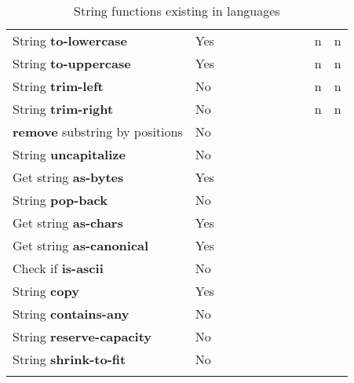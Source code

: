 \documentclass[anonymous,sigplan,review,11pt,nonacm,natbib=false]{acmart}
\begin{document}
\begin{longtable}{lllllllllll}
        String \textbf{to-lowercase} & Yes &  &  &  &  & &  &  & n & n \\

        String \textbf{to-uppercase} & Yes &  &  &  &  & &  &  & n & n \\

        String \textbf{trim-left} & No &  &  &  &  &  &  &  & n & n \\

        String \textbf{trim-right} & No &  &  &  &  & &  &  & n & n \\

        \textbf{remove} substring by positions & No &  &  &  &  & &  &  &  & \\

        String \textbf{uncapitalize} & No &  &  &  &  & &  &  &  & \\

        Get string \textbf{as-bytes} & Yes &  &  &  &  & &  &  &  & \\

        String \textbf{pop-back} & No &  &  &  &  & &  &  &  & \\

        Get string \textbf{as-chars} & Yes &  &  &  &  & &  &  &  & \\

        Get string \textbf{as-canonical} & Yes &  &  &  &  & &  &  &  & \\

        Check if \textbf{is-ascii} & No &  &  &  &  & &  &  &  & \\

        String \textbf{copy} & Yes &  &  &  &  & &  &  &  & \\

        String \textbf{contains-any} & No &  &  &  &  & &  &  &  & \\

        String \textbf{reserve-capacity} & No &  &  &  &  & &  &  &  & \\

        String \textbf{shrink-to-fit} & No &  &  &  &  & &  &  &  & \\ \hline
        \caption{String functions existing in languages}
        \label{tab:my_label}
    \end{longtable}

    \printbibliography
\end{document}
